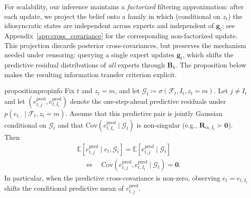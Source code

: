 For scalability, our inference maintains a \emph{factorized} filtering approximation: after each
update, we project the belief onto a family in which (conditional on \(z_t\)) the idiosyncratic
states are independent across experts and independent of \(\mathbf{g}_t\); see
Appendix~\ref{app:cross_covariance} for the corresponding non-factorized update. This projection
discards posterior cross-covariances, but preserves the mechanism needed under censoring: querying a
single expert updates \(\mathbf{g}_t\), which shifts the predictive residual distributions of \emph{all}
experts through \(\mathbf{B}_k\). The proposition below makes the resulting information transfer
criterion explicit.

\begin{restatable}{proposition}{propinfo}
\label{prop:cross_update}
Fix \(t\) and \(z_t=m\), and let \(\mathcal{G}_t\coloneqq \sigma(\mathcal{F}_t,I_t,z_t=m)\). Let
\(j\neq I_t\) and let \((e_{t,j}^{\mathrm{pred}},e_{t,I_t}^{\mathrm{pred}})\) denote the one-step-ahead
predictive residuals under \(p(e_{t,\cdot}\mid \mathcal{F}_t,z_t=m)\). Assume that this predictive pair
is jointly Gaussian conditional on \(\mathcal{G}_t\) and that
\(\mathrm{Cov}(e_{t,I_t}^{\mathrm{pred}}\mid \mathcal{G}_t)\) is non-singular (e.g.,
\(\mathbf{R}_{m,I_t}\succ \mathbf{0}\)). Then
\begin{equation*}
    \begin{aligned}
        & \mathbb{E}\left[e_{t,j}^{\mathrm{pred}}\mid e_t,\mathcal{G}_t\right]
=
\mathbb{E}\left[e_{t,j}^{\mathrm{pred}}\mid \mathcal{G}_t\right] \\
& \quad\Longleftrightarrow\quad
\mathrm{Cov}\left(e_{t,j}^{\mathrm{pred}},e_{t,I_t}^{\mathrm{pred}}\mid \mathcal{G}_t\right)=\mathbf{0}.
    \end{aligned}
\end{equation*}
In particular, when the predictive cross-covariance is non-zero, observing \(e_t=e_{t,I_t}\) shifts
the conditional predictive mean of \(e_{t,j}^{\mathrm{pred}}\).
\end{restatable}

